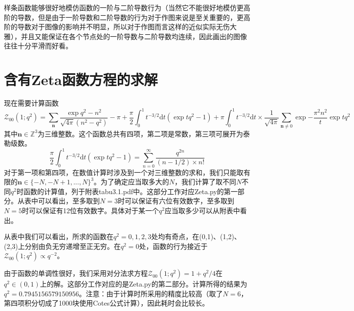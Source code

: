 \documentclass[UTF8]{ctexart}
\begin{document}
样条函数能够很好地模仿函数的一阶与二阶导数行为（当然它不能很好地模仿更高阶的导数，但是由于一阶导数和二阶导数的行为对于作图来说是至关重要的，更高阶的导数对于图像的影响并不明显，所以对于作图而言这样的近似实际无伤大雅），并且又能保证在各个节点处的一阶导数与二阶导数均连续，因此画出的图像往往十分平滑而好看。
\section{含有Zeta函数方程的求解}
现在需要计算函数
\[
\mathcal{Z}_{00}(1;q^2)=\sum\limits_{\mathbf{n}}\frac{\exp{q^2-n^2}}{\sqrt{4\pi}(n^2-q^2)}-\pi+\frac{\pi}{2}\int_{0}^{1}t^{-3/2}\mathrm{d}t(\exp{tq^2}-1)+\pi\int_{0}^{1}t^{-3/2}\mathrm{d}t\times\frac{1}{\sqrt{4\pi}}\sum\limits_{\mathbf{n}\neq 0}\exp{-\frac{\pi^2n^2}{t}}\exp{tq^2}
\]
其中$\mathbf{n}\in\mathds{Z}^3$为三维整数。这个函数总共有四项，第二项是常数，第三项可展开为泰勒级数。
\[
\frac{\pi}{2}\int_{0}^{1}t^{-3/2}\mathrm{d}t(\exp{tq^2}-1)=\sum\limits_{n=0}^{\infty}\frac{q^{2n}}{(n-1/2)\times n!}
\]
对于第一项和第四项，在数值计算时涉及到一个对三维整数的求和，我们只能取有限的$\mathbf{n}\in\{-N,-N+1,...,N\}^3$。为了确定应当取多大的$N$，我们计算了取不同$N$不同$q^2$时函数的计算值，列于附表tabu3.1.pdf中。这部分工作对应Zeta.py的第一部分。从表中可以看出，至多取到$N=3$时可以保证有六位有效数字，至多取到$N=5$时可以保证有12位有效数字。具体对于某一个$q^2$应当取多少可以从附表中看出。

从表中我们可以看出，所求的函数在$q^2=0,1,2,3$处均有奇点，在(0,1)、(1,2)、(2,3)上分别由负无穷递增至正无穷。在$q^2=0$处，函数的行为接近于$\mathcal{Z}_{00}(1;q^2)\propto q^{-2}$。

由于函数的单调性很好，我们采用对分法求方程$\mathcal{Z}_{00}(1;q^2)=1+q^2/4$在$q^2\in(0,1)$上的解。这部分工作对应的是Zeta.py的第二部分。计算所得的结果为$q^2=\num{0.7945156579150956}$。注意：由于计算时所采用的精度比较高（取了$N=6$，第四项积分切成了1000块使用Cotes公式计算），因此耗时会比较长。
\end{document}
